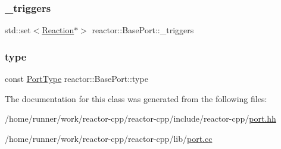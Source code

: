 \subsubsection{\texorpdfstring{\+\_\+triggers}{\_triggers}}
{\footnotesize\ttfamily std\+::set$<$\hyperlink{classreactor_1_1Reaction}{Reaction}$\ast$$>$ reactor\+::\+Base\+Port\+::\+\_\+triggers\hspace{0.3cm}{\ttfamily [private]}}

\mbox{\label{classreactor_1_1BasePort_a9af5e0d55ee1a425b2c5975ab1ca871e}} 
\subsubsection{\texorpdfstring{type}{type}}
{\footnotesize\ttfamily const \hyperlink{namespacereactor_a08c8e2d85e5bc706b1af8a87e40eec6d}{Port\+Type} reactor\+::\+Base\+Port\+::type\hspace{0.3cm}{\ttfamily [private]}}



The documentation for this class was generated from the following files\+:\begin{DoxyCompactItemize}
\item 
/home/runner/work/reactor-\/cpp/reactor-\/cpp/include/reactor-\/cpp/\hyperlink{port_8hh}{port.\+hh}\item 
/home/runner/work/reactor-\/cpp/reactor-\/cpp/lib/\hyperlink{port_8cc}{port.\+cc}\end{DoxyCompactItemize}
